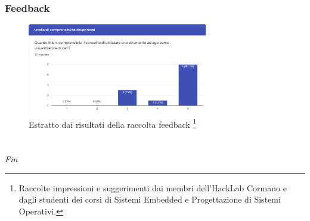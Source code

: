 \documentclass[aspectratio=169]{beamer}
\begin{document}
\begin{frame}
\frametitle{Feedback}
\begin{figure}[h]
  \centering
  \includegraphics[width=0.7\textwidth]{esempioform}
  \caption{Estratto dai risultati della raccolta feedback \footnote{Raccolte impressioni e suggerimenti dai membri dell'HackLab Cormano e dagli studenti dei corsi di Sistemi Embedded e Progettazione di Sistemi Operativi.}}
\end{figure}
\end{frame} %

\section*{}
\begin{frame}{}
  \centering \Large
  \emph{Fin}
\end{frame}
\end{document}
